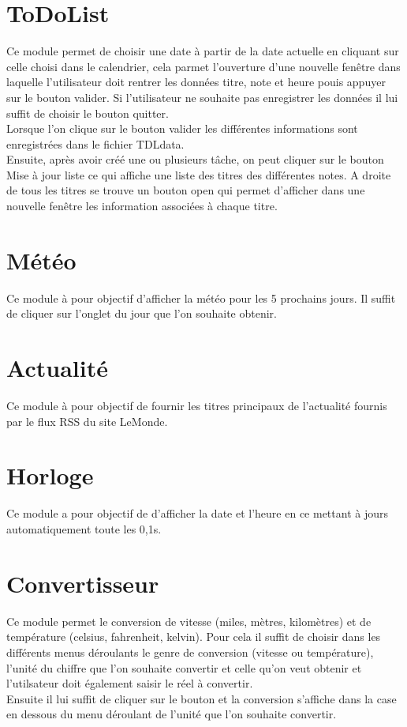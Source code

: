 \documentclass[12pt]{report}
\begin{document}
    \section{ToDoList}
      Ce module permet de choisir une date à partir de la date actuelle en cliquant sur celle choisi dans le calendrier, cela parmet l'ouverture d'une nouvelle fenêtre dans laquelle l'utilisateur doit rentrer les données titre, note et heure pouis appuyer sur le bouton valider. Si l'utilisateur ne souhaite pas enregistrer les données il lui suffit de choisir le bouton quitter.
      \\
      Lorsque l'on clique sur le bouton valider les différentes informations sont enregistrées dans le fichier TDLdata.
      \\
      Ensuite, après avoir créé une ou plusieurs tâche, on peut cliquer sur le bouton Mise à jour liste ce qui affiche une liste des titres des différentes notes. A droite de tous les titres se trouve un bouton open qui permet d'afficher dans une nouvelle fenêtre les information associées à chaque titre.

    \section{Météo}

      Ce module à pour objectif d'afficher la météo pour les 5 prochains jours.
      Il suffit de cliquer sur l'onglet du jour que l'on souhaite obtenir.

    \section{Actualité}

      Ce module à pour objectif de fournir les titres principaux de l'actualité fournis par le flux RSS du site LeMonde.

    \section{Horloge}

      Ce module a pour objectif de d'afficher la date et l'heure en ce mettant à jours automatiquement toute les 0,1s.

    \section{Convertisseur}

      Ce module permet le conversion de vitesse (miles, mètres, kilomètres) et de température (celsius, fahrenheit, kelvin). Pour cela il suffit de choisir dans les différents menus déroulants le genre de conversion (vitesse ou température), l'unité du chiffre que l'on souhaite convertir et celle qu'on veut obtenir et l'utilsateur doit également saisir le réel à convertir.
      \\
      Ensuite il lui suffit de cliquer sur le bouton et la conversion s'affiche dans la case en dessous du menu déroulant de l'unité que l'on souhaite convertir.
\end{document}
